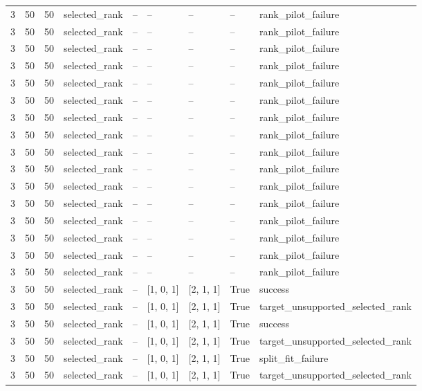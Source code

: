 \begin{longtable}{lllllllll}
3 & 50 & 50 & selected\_rank & -- & -- & -- & -- & rank\_pilot\_failure \\
3 & 50 & 50 & selected\_rank & -- & -- & -- & -- & rank\_pilot\_failure \\
3 & 50 & 50 & selected\_rank & -- & -- & -- & -- & rank\_pilot\_failure \\
3 & 50 & 50 & selected\_rank & -- & -- & -- & -- & rank\_pilot\_failure \\
3 & 50 & 50 & selected\_rank & -- & -- & -- & -- & rank\_pilot\_failure \\
3 & 50 & 50 & selected\_rank & -- & -- & -- & -- & rank\_pilot\_failure \\
3 & 50 & 50 & selected\_rank & -- & -- & -- & -- & rank\_pilot\_failure \\
3 & 50 & 50 & selected\_rank & -- & -- & -- & -- & rank\_pilot\_failure \\
3 & 50 & 50 & selected\_rank & -- & -- & -- & -- & rank\_pilot\_failure \\
3 & 50 & 50 & selected\_rank & -- & -- & -- & -- & rank\_pilot\_failure \\
3 & 50 & 50 & selected\_rank & -- & -- & -- & -- & rank\_pilot\_failure \\
3 & 50 & 50 & selected\_rank & -- & -- & -- & -- & rank\_pilot\_failure \\
3 & 50 & 50 & selected\_rank & -- & -- & -- & -- & rank\_pilot\_failure \\
3 & 50 & 50 & selected\_rank & -- & -- & -- & -- & rank\_pilot\_failure \\
3 & 50 & 50 & selected\_rank & -- & -- & -- & -- & rank\_pilot\_failure \\
3 & 50 & 50 & selected\_rank & -- & -- & -- & -- & rank\_pilot\_failure \\
3 & 50 & 50 & selected\_rank & -- & [1, 0, 1] & [2, 1, 1] & True & success \\
3 & 50 & 50 & selected\_rank & -- & [1, 0, 1] & [2, 1, 1] & True & target\_unsupported\_selected\_rank \\
3 & 50 & 50 & selected\_rank & -- & [1, 0, 1] & [2, 1, 1] & True & success \\
3 & 50 & 50 & selected\_rank & -- & [1, 0, 1] & [2, 1, 1] & True & target\_unsupported\_selected\_rank \\
3 & 50 & 50 & selected\_rank & -- & [1, 0, 1] & [2, 1, 1] & True & split\_fit\_failure \\
3 & 50 & 50 & selected\_rank & -- & [1, 0, 1] & [2, 1, 1] & True & target\_unsupported\_selected\_rank \\

\end{longtable}
